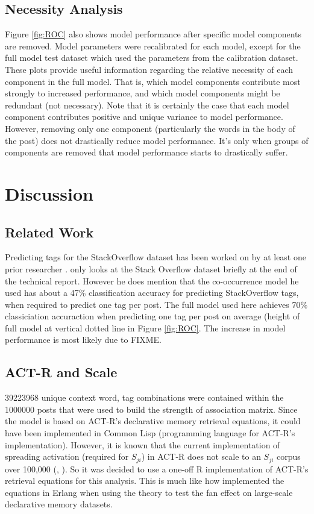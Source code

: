 \documentclass[10pt,letterpaper]{article}
\begin{document}
\subsection{Necessity Analysis}

Figure \ref{fig:ROC} also shows model performance after specific model components are removed.
Model parameters were recalibrated for each model, except for the full model test dataset which used the parameters from the calibration dataset.
These plots provide useful information regarding the relative necessity of each component in the full model.
That is, which model components contribute most strongly to increased performance, and which model components might be redundant (not necessary).
Note that it is certainly the case that each model component contributes positive and unique variance to model performance.
However, removing only one component (particularly the words in the body of the post) does not drastically reduce model performance.
It's only when groups of components are removed that model performance starts to drastically suffer.

\section{Discussion}

\subsection{Related Work}
Predicting tags for the StackOverflow dataset has been worked on by at least one prior researcher \cite{Kuo2011}.
 only looks at the Stack Overflow dataset briefly at the end of the technical report.
However he does mention that the co-occurrence model he used has about a 47\% classification accuracy for predicting StackOverflow tags, when required to predict one tag per post.
The full model used here achieves 70\% classiciation accuraction when predicting one tag per post on average (height of full model at vertical dotted line in Figure \ref{fig:ROC}.
The increase in model performance is most likely due to FIXME.

\subsection{ACT-R and Scale}
\num{39223968} unique context word, tag combinations were contained within the \num{1000000} posts that were used to build the strength of association matrix.
Since the model is based on ACT-R's declarative memory retrieval equations, it could have been implemented in Common Lisp (programming language for ACT-R's implementation).
However, it is known that the current implementation of spreading activation (required for $S_{ji}$) in ACT-R does not scale to an $S_{ji}$ corpus over 100,000 (, ).
So it was decided to use a one-off R implementation of ACT-R's retrieval equations for this analysis.
This is much like how  implemented the equations in Erlang when using the theory to test the fan effect on large-scale declarative memory datasets.
\end{document}

